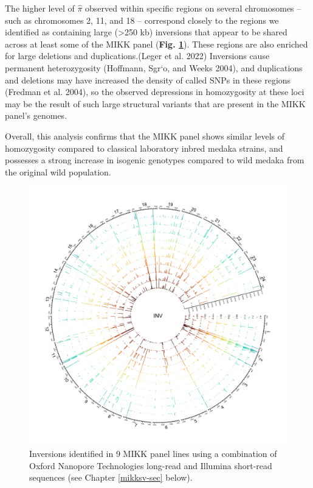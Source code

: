 \documentclass[
]{book}
\begin{document}
The higher level of \(\hat{\pi}\) observed within specific regions on several chromosomes -- such as chromosomes 2, 11, and 18 -- correspond closely to the regions we identified as containing large (\textgreater250 kb) inversions that appear to be shared across at least some of the MIKK panel (\textbf{Fig. \ref{fig:SVInvs}}). These regions are also enriched for large deletions and duplications.(Leger et al. 2022) Inversions cause permanent heterozygosity (Hoffmann, Sgr`o, and Weeks 2004), and duplications and deletions may have increased the density of called SNPs in these regions (Fredman et al. 2004), so the observed depressions in homozygosity at these loci may be the result of such large structural variants that are present in the MIKK panel's genomes.

Overall, this analysis confirms that the MIKK panel shows similar levels of homozygosity compared to classical laboratory inbred medaka strains, and possesses a strong increase in isogenic genotypes compared to wild medaka from the original wild population.



\begin{figure}
\includegraphics[width=1\linewidth]{figs/mikk_genome/20210224_sv_invs_lines} \caption{Inversions identified in 9 MIKK panel lines using a combination of Oxford Nanopore Technologies long-read and Illumina short-read sequences (see Chapter \ref{mikksv-sec} below).}\label{fig:SVInvs}
\end{figure}
\end{document}
